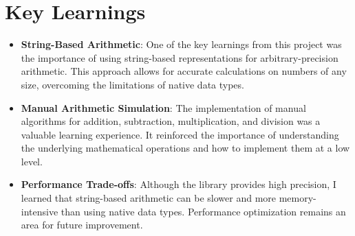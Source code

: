 \documentclass[12pt]{article}
\begin{document}
\section{Key Learnings}
\begin{itemize}
    \item \textbf{String-Based Arithmetic}: One of the key learnings from this project was the importance of using string-based representations for arbitrary-precision arithmetic. This approach allows for accurate calculations on numbers of any size, overcoming the limitations of native data types.
    \item \textbf{Manual Arithmetic Simulation}: The implementation of manual algorithms for addition, subtraction, multiplication, and division was a valuable learning experience. It reinforced the importance of understanding the underlying mathematical operations and how to implement them at a low level.
    \item \textbf{Performance Trade-offs}: Although the library provides high precision, I learned that string-based arithmetic can be slower and more memory-intensive than using native data types. Performance optimization remains an area for future improvement.
\end{itemize}
\end{document}
